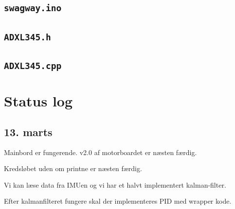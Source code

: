 \documentclass[a4paper,oneside,article,danish,table]{memoir}
\begin{document}
\section{\texttt{swagway.ino}}

\section{\texttt{ADXL345.h}}

\section{\texttt{ADXL345.cpp}}


\chapter{Status log}

\section{13. marts}
Mainbord er fungerende. v2.0 af motorboardet er næsten færdig.

Kredsløbet uden om printne er næsten færdig.

Vi kan læse data fra IMUen og vi har et halvt implementert kalman-filter.

Efter kalmanfilteret fungere skal der implementeres PID med wrapper kode.
\end{document}
